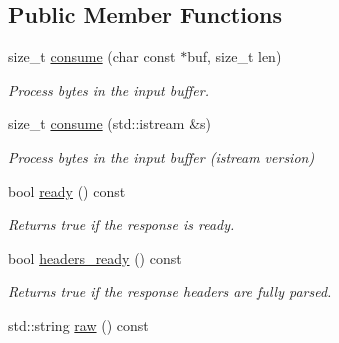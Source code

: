 \subsection*{Public Member Functions}
\begin{DoxyCompactItemize}
\item 
size\+\_\+t \hyperlink{classwebsocketpp_1_1http_1_1parser_1_1response_ae99b8f1287898b74d1963b95347ab838}{consume} (char const $\ast$buf, size\+\_\+t len)
\begin{DoxyCompactList}\small\item\em Process bytes in the input buffer. \end{DoxyCompactList}\item 
size\+\_\+t \hyperlink{classwebsocketpp_1_1http_1_1parser_1_1response_a5b274a9e5766e679f0939a7e1ecbad56}{consume} (std\+::istream \&s)
\begin{DoxyCompactList}\small\item\em Process bytes in the input buffer (istream version) \end{DoxyCompactList}\item 
bool \hyperlink{classwebsocketpp_1_1http_1_1parser_1_1response_ab3f1f2bb2c79a779a8e7d649ea722421}{ready} () const
\begin{DoxyCompactList}\small\item\em Returns true if the response is ready. \end{DoxyCompactList}\item 
bool \hyperlink{classwebsocketpp_1_1http_1_1parser_1_1response_a844549873f4b6c36d04c141925ee2dd2}{headers\+\_\+ready} () const\hypertarget{classwebsocketpp_1_1http_1_1parser_1_1response_a844549873f4b6c36d04c141925ee2dd2}{}\label{classwebsocketpp_1_1http_1_1parser_1_1response_a844549873f4b6c36d04c141925ee2dd2}

\begin{DoxyCompactList}\small\item\em Returns true if the response headers are fully parsed. \end{DoxyCompactList}\item 
std\+::string \hyperlink{classwebsocketpp_1_1http_1_1parser_1_1response_a46ebda97244f3235eaaccb1bcbdc5666}{raw} () const\hypertarget{classwebsocketpp_1_1http_1_1parser_1_1response_a46ebda97244f3235eaaccb1bcbdc5666}{}\label{classwebsocketpp_1_1http_1_1parser_1_1response_a46ebda97244f3235eaaccb1bcbdc5666}


\end{DoxyCompactItemize}
